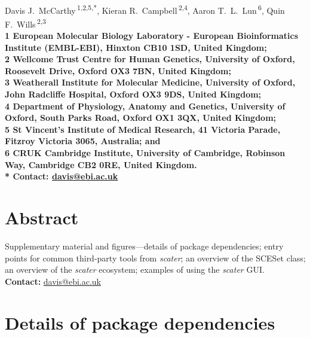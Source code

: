 \documentclass[10pt,letterpaper]{article}
\begin{document}
\vspace*{0.35in}

\begin{flushleft}
{\Large
\textbf{}
}
\newline
\\
Davis J.~McCarthy\,\textsuperscript{1,2,5,*},
Kieran R.~Campbell\,\textsuperscript{2,4},
Aaron T.~L.~Lun\,\textsuperscript{6},
Quin F.~Wills\,\textsuperscript{2,3}
\\
\bigskip
\bf{1} European Molecular Biology Laboratory - European Bioinformatics Institute (EMBL-EBI), Hinxton CB10 1SD, United Kingdom;
\\
\bf{2} Wellcome Trust Centre for Human Genetics, University of Oxford,
Roosevelt Drive, Oxford OX3 7BN, United Kingdom;
\\
\bf{3} Weatherall Institute for Molecular Medicine, University of Oxford, John Radcliffe Hospital, Oxford OX3 9DS, United Kingdom;
\\
\bf{4} Department of Physiology, Anatomy and Genetics, University of Oxford, South Parks Road, Oxford OX1 3QX, United Kingdom;
\\
\bf{5} St Vincent's Institute of Medical Research, 41 Victoria Parade, Fitzroy Victoria 3065, Australia; and
\\
\bf{6} CRUK Cambridge Institute, University of Cambridge, Robinson Way, Cambridge CB2 0RE, United Kingdom.
\\
\bigskip
* \textbf{Contact:} \href{davis@ebi.ac.uk}{davis@ebi.ac.uk}

\end{flushleft}

\section*{Abstract}
Supplementary material and figures---details of package dependencies; entry points for common third-party tools from \emph{scater}; an overview of the SCESet class; an overview of the \emph{scater} ecosystem; examples of using the \emph{scater} GUI.\\ \noindent
\textbf{Contact:} \href{davis@ebi.ac.uk}{davis@ebi.ac.uk}


\linenumbers


\section*{Details of package dependencies}
\end{document}
